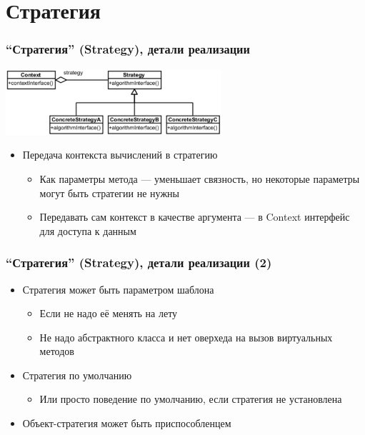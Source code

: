 \documentclass[xetex,mathserif,serif]{beamer}
\begin{document}
    \section{Стратегия}

    \begin{frame}
        \frametitle{``Стратегия'' (Strategy), детали реализации}
        \begin{center}
            \includegraphics[width=0.6\textwidth]{strategy.png}
        \end{center}
        \begin{itemize}
            \item Передача контекста вычислений в стратегию
            \begin{itemize}
                \item Как параметры метода --- уменьшает связность, но некоторые параметры могут быть стратегии не нужны
                \item Передавать сам контекст в качестве аргумента --- в Context интерфейс для доступа к данным
            \end{itemize}
        \end{itemize}
    \end{frame}

    \begin{frame}
        \frametitle{``Стратегия'' (Strategy), детали реализации (2)}
        \begin{itemize}
            \item Стратегия может быть параметром шаблона
            \begin{itemize}
                \item Если не надо её менять на лету
                \item Не надо абстрактного класса и нет оверхеда на вызов виртуальных методов
            \end{itemize}
            \item Стратегия по умолчанию
            \begin{itemize}
                \item Или просто поведение по умолчанию, если стратегия не установлена
            \end{itemize}
            \item Объект-стратегия может быть приспособленцем
        \end{itemize}
    \end{frame}
\end{document}
